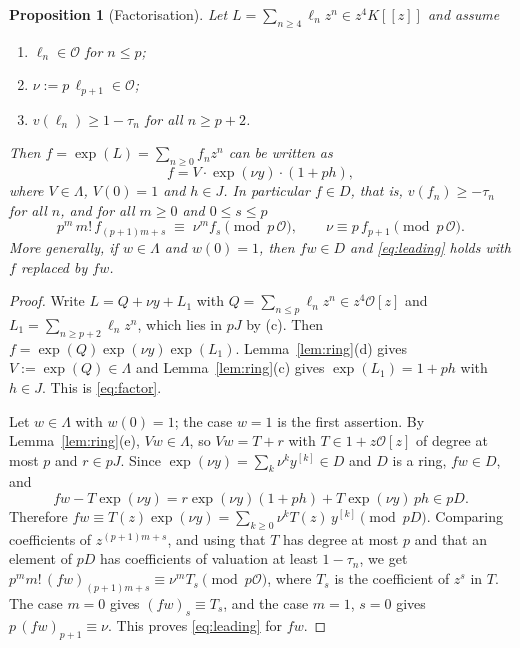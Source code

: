 \documentclass[11pt]{amsart}
\newtheorem{proposition}[theorem]{Proposition}
\theoremstyle{definition}
\theoremstyle{remark}
\newcommand{\cO}{\mathcal{O}}
\newcommand{\dpow}[2]{#1^{[#2]}}
\begin{document}
\begin{proposition}[Factorisation]\label{prop:structure}
Let $L=\sum_{n\ge4}\ell_nz^n\in z^4K[[z]]$ and assume
\begin{enumerate}
\item[(a)] $\ell_n\in\cO$ for $n\le p$;
\item[(b)] $\nu:=p\,\ell_{p+1}\in\cO$;
\item[(c)] $v(\ell_n)\ge1-\tau_n$ for all $n\ge p+2$.
\end{enumerate}
Then $f=\exp(L)=\sum_{n\ge0}f_nz^n$ can be written as
\begin{equation}\label{eq:factor}
f=V\cdot\exp(\nu y)\cdot(1+ph),
\end{equation}
where $V\in\Lambda$, $V(0)=1$ and $h\in J$. In particular
$f\in D$, that is, $v(f_n)\ge-\tau_n$ for all $n$, and for all $m\ge0$ and $0\le s\le p$
\begin{equation}\label{eq:leading}
p^m\,m!\,f_{(p+1)m+s}\;\equiv\;\nu^m f_s\pmod{p\,\cO},\qquad \nu\equiv p\,f_{p+1}\pmod{p\,\cO}.
\end{equation}
More generally, if $w\in\Lambda$ and $w(0)=1$, then $fw\in D$ and \eqref{eq:leading} holds with
$f$ replaced by $fw$.
\end{proposition}

\begin{proof}
Write $L=Q+\nu y+L_1$ with $Q=\sum_{n\le p}\ell_nz^n\in z^4\cO[z]$ and
$L_1=\sum_{n\ge p+2}\ell_nz^n$, which lies in $pJ$ by (c). Then
$f=\exp(Q)\exp(\nu y)\exp(L_1)$. Lemma~\ref{lem:ring}(d) gives $V:=\exp(Q)\in\Lambda$ and
Lemma~\ref{lem:ring}(c) gives $\exp(L_1)=1+ph$ with $h\in J$. This is \eqref{eq:factor}.

Let $w\in\Lambda$ with $w(0)=1$; the case $w=1$ is the first assertion. By
Lemma~\ref{lem:ring}(e), $Vw\in\Lambda$, so $Vw=T+r$ with $T\in1+z\cO[z]$ of degree at most $p$
and $r\in pJ$. Since $\exp(\nu y)=\sum_k\nu^k\dpow{y}{k}\in D$ and $D$ is a ring, $fw\in D$, and
\[
fw-T\exp(\nu y)=r\exp(\nu y)(1+ph)+T\exp(\nu y)\,ph\in pD .
\]
Therefore $fw\equiv T(z)\exp(\nu y)=\sum_{k\ge0}\nu^kT(z)\,\dpow{y}{k}\pmod{pD}$. Comparing
coefficients of $z^{(p+1)m+s}$, and using that $T$ has degree at most $p$ and that an element of
$pD$ has coefficients of valuation at least $1-\tau_n$, we get
$p^mm!\,(fw)_{(p+1)m+s}\equiv\nu^mT_s\pmod{p\cO}$, where $T_s$ is the coefficient of $z^s$ in $T$.
The case $m=0$ gives $(fw)_s\equiv T_s$, and the case $m=1$, $s=0$ gives $p\,(fw)_{p+1}\equiv\nu$.
This proves \eqref{eq:leading} for $fw$.
\end{proof}
\end{document}
